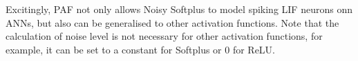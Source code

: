 \documentclass{article}
\begin{document}
Excitingly, PAF not only allows Noisy Softplus to model spiking LIF neurons onn ANNs, but also can be generalised to other activation functions.
Note that the calculation of noise level is not necessary for other activation functions, for example, it can be set to a constant for Softplus or 0 for ReLU.
%
%
%
%
%
\end{document}
